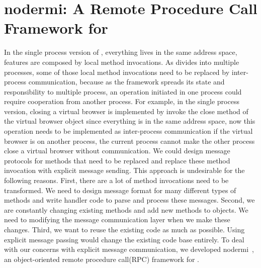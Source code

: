 \chapter{nodermi: A Remote Procedure Call Framework for \nodejs{}}
\label{ch:rmi}
In the single process version of \cb, 
everything lives in the same address space,
features are composed by local method invocations.
As \cbtwo divides \cb into multiple processes,
some of those local method invocations need to be replaced by 
inter-process communication,
because 
as the framework spreads its state 
and responsibility to multiple process,
an operation initiated in one process
could require cooperation from another process.
For example, 
in the single process version, 
closing a virtual browser
is implemented by invoke the close method of the virtual browser
object since everything is in the same address space,
now this operation needs to be implemented as inter-process
communication if the virtual browser is on another process,
the current process cannot make the other process close a virtual browser 
without communication.
We could design message protocols for methods that need
to be replaced and replace these method invocation
 with explicit message sending.
This approach is undesirable for the following reasons.
First, there are a lot of method invocations need to be transformed.
We need to design message format for many different types of methods and
write handler code to parse and process these messages.
Second, we are constantly changing existing methods and add
new methods to objects.
We need to modifying the message communication layer 
when we make these changes.
Third, 
we want to reuse the existing code as much as possible.
Using explicit message passing would change the existing code base entirely.
To deal with our concerns with explicit message communication,
we developed nodermi~\cite{nodermi}, an object-oriented
remote procedure call(RPC) framework for \nodejs{}.

